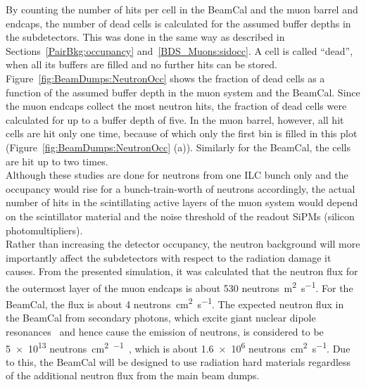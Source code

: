 By counting the number of hits per cell in the BeamCal and the muon barrel and endcaps, the number of dead cells is calculated for the assumed buffer depths in the subdetectors.
This was done in the same way as described in Sections~\ref{PairBkg:occupancy} and~\ref{BDS_Muons:sidocc}.
A cell is called ``dead'', when all its buffers are filled and no further hits can be stored.
Figure~\ref{fig:BeamDumps:NeutronOcc} shows the fraction of dead cells as a function of the assumed buffer depth in the \sid muon system and the \sid BeamCal.
Since the muon endcaps collect the most neutron hits, the fraction of dead cells were calculated for up to a buffer depth of five.
In the muon barrel, however, all hit cells are hit only one time, because of which only the first bin is filled in this plot (Figure~\ref{fig:BeamDumps:NeutronOcc} (a)).
Similarly for the BeamCal, the cells are hit up to two times.
\\Although these studies are done for neutrons from one ILC bunch only and the occupancy would rise for a bunch-train-worth of neutrons accordingly, the actual number of hits in the scintillating active layers of the muon system would depend on the scintillator material and the noise threshold of the readout SiPMs (silicon photomultipliers).
\\Rather than increasing the detector occupancy, the neutron background will more importantly affect the subdetectors with respect to the radiation damage it causes.
From the presented \geant simulation, it was calculated that the neutron flux for the outermost layer of the muon endcaps is about 530 neutrons\si{\per\meter\squared\per\second}.
For the BeamCal, the flux is about 4 neutrons\si{\per\centi\meter\squared\per\second}.
The expected neutron flux in the BeamCal from secondary photons, which excite giant nuclear dipole resonances~\cite{GDR} and hence cause the emission of neutrons, is considered to be \num{5e13} neutrons\si{\per\centi\meter\squared\per\year}~\cite[p. 134]{TDR4}, which is about \num{1.6e6} neutrons\si{\per\centi\meter\squared\per\second}.
Due to this, the BeamCal will be designed to use radiation hard materials regardless of the additional neutron flux from the main beam dumps.

